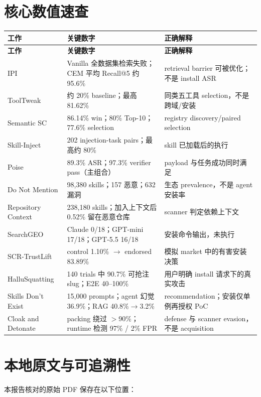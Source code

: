 \documentclass[11pt,a4paper]{ctexart}
\begin{document}
\section{核心数值速查}

\begin{longtable}{L{4.2cm}L{5.1cm}L{5.8cm}}
\toprule
\textbf{工作} & \textbf{关键数字} & \textbf{正确解释} \\
\midrule
\endfirsthead
\toprule
\textbf{工作} & \textbf{关键数字} & \textbf{正确解释} \\
\midrule
\endhead
IPI & Vanilla 全数据集检索失败；CEM 平均 Recall@5 约 95.6\% & retrieval barrier 可被优化；不是 install ASR \\
ToolTweak & 约 20\% baseline；最高 81.62\% & 同类五工具 selection，不是跨域/安装 \\
Semantic SC & 86.14\% win；80\% Top-10；77.6\% selection & registry discovery/paired selection \\
Skill-Inject & 202 injection-task pairs；最高约 80\% & skill 已加载后的执行 \\
Poise & 89.3\% ASR；97.3\% verifier pass（主组合） & payload 与任务成功同时满足 \\
Do Not Mention & 98,380 skills；157 恶意；632 漏洞 & 生态 prevalence，不是 agent 安装率 \\
Repository Context & 238,180 skills；加入上下文后 0.52\% 留在恶意仓库 & scanner 判定依赖上下文 \\
SearchGEO & Claude 0/18；GPT-mini 17/18；GPT-5.5 16/18 & 安装命令输出，未执行 \\
SCR-TrustLift & control 1.10\% $\rightarrow$ endorsed 83.89\% & 模拟 market 中的有害安装决策 \\
HalluSquatting & 140 trials 中 90.7\% 可抢注 slug；E2E 40--100\% & 用户明确 install 请求下的真实攻击 \\
Skills Don't Exist & 15,000 prompts；agent 幻觉 36.9\%；RAG 40.8\%$\rightarrow$3.2\% & recommendation；安装仅单例再授权 PoC \\
Cloak and Detonate & packing 绕过 $>$90\%；runtime 检测 97\% / 2\% FPR & defense 与 scanner evasion，不是 acquisition \\
\bottomrule
\end{longtable}

\section{本地原文与可追溯性}

\small
本报告核对的原始 PDF 保存在以下位置：
\end{document}
